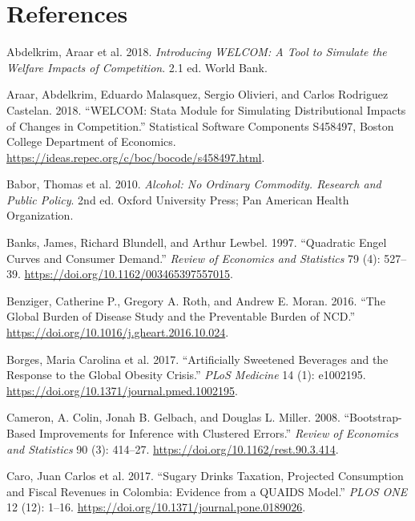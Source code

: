 \documentclass[
  11pt,
]{article}
\newlength{\cslhangindent}
\newenvironment{CSLReferences}[2] %
 {\begin{list}{}{%
  \setlength{\itemindent}{0pt}
  \setlength{\leftmargin}{0pt}
  \setlength{\parsep}{0pt}
  \ifodd #1
   \setlength{\leftmargin}{\cslhangindent}
   \setlength{\itemindent}{-1\cslhangindent}
  \fi
  \setlength{\itemsep}{#2\baselineskip}}}
 {\end{list}}
\begin{document}
\clearpage

\section*{References}\label{references}

\label{refs}
\begin{CSLReferences}{1}{0}
Abdelkrim, Araar et al. 2018. \emph{Introducing {WELCOM}: A Tool to
Simulate the Welfare Impacts of Competition}. 2.1 ed. World Bank.

Araar, Abdelkrim, Eduardo Malasquez, Sergio Olivieri, and Carlos
Rodriguez Castelan. 2018. {``{WELCOM}: Stata Module for Simulating
Distributional Impacts of Changes in Competition.''} Statistical
Software Components S458497, Boston College Department of Economics.
\url{https://ideas.repec.org/c/boc/bocode/s458497.html}.

Babor, Thomas et al. 2010. \emph{Alcohol: No Ordinary Commodity.
Research and Public Policy}. 2nd ed. Oxford University Press; Pan
American Health Organization.

Banks, James, Richard Blundell, and Arthur Lewbel. 1997. {``Quadratic
{Engel} Curves and Consumer Demand.''} \emph{Review of Economics and
Statistics} 79 (4): 527--39.
\url{https://doi.org/10.1162/003465397557015}.

Benziger, Catherine P., Gregory A. Roth, and Andrew E. Moran. 2016.
{``The Global Burden of Disease Study and the Preventable Burden of
{NCD}.''} \url{https://doi.org/10.1016/j.gheart.2016.10.024}.

Borges, Maria Carolina et al. 2017. {``Artificially Sweetened Beverages
and the Response to the Global Obesity Crisis.''} \emph{PLoS Medicine}
14 (1): e1002195. \url{https://doi.org/10.1371/journal.pmed.1002195}.

Cameron, A. Colin, Jonah B. Gelbach, and Douglas L. Miller. 2008.
{``Bootstrap-Based Improvements for Inference with Clustered Errors.''}
\emph{Review of Economics and Statistics} 90 (3): 414--27.
\url{https://doi.org/10.1162/rest.90.3.414}.

Caro, Juan Carlos et al. 2017. {``Sugary Drinks Taxation, Projected
Consumption and Fiscal Revenues in {Colombia}: Evidence from a {QUAIDS}
Model.''} \emph{PLOS ONE} 12 (12): 1--16.
\url{https://doi.org/10.1371/journal.pone.0189026}.


\end{CSLReferences}
\end{document}
